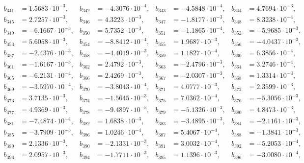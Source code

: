 \begin{align*}
b_{ 341 } &= 1.5683 \cdot 10^{ -3 }, & b_{ 342 } &= -4.3076 \cdot 10^{ -4 }, & b_{ 343 } &= -4.5848 \cdot 10^{ -4 }, & b_{ 344 } &= 4.7694 \cdot 10^{ -3 },\\ 
b_{ 345 } &= 2.7257 \cdot 10^{ -3 }, & b_{ 346 } &= 4.3223 \cdot 10^{ -3 }, & b_{ 347 } &= -1.8177 \cdot 10^{ -3 }, & b_{ 348 } &= 8.3238 \cdot 10^{ -4 },\\ 
b_{ 349 } &= -6.1667 \cdot 10^{ -3 }, & b_{ 350 } &= 5.7352 \cdot 10^{ -3 }, & b_{ 351 } &= -1.1865 \cdot 10^{ -4 }, & b_{ 352 } &= -5.9685 \cdot 10^{ -3 },\\ 
b_{ 353 } &= 5.6058 \cdot 10^{ -3 }, & b_{ 354 } &= -8.8412 \cdot 10^{ -4 }, & b_{ 355 } &= 1.9687 \cdot 10^{ -3 }, & b_{ 356 } &= -4.0437 \cdot 10^{ -3 },\\ 
b_{ 357 } &= -2.4376 \cdot 10^{ -3 }, & b_{ 358 } &= -4.4019 \cdot 10^{ -3 }, & b_{ 359 } &= 1.1827 \cdot 10^{ -4 }, & b_{ 360 } &= 6.3856 \cdot 10^{ -4 },\\ 
b_{ 361 } &= -1.6167 \cdot 10^{ -3 }, & b_{ 362 } &= 2.4792 \cdot 10^{ -3 }, & b_{ 363 } &= -2.4796 \cdot 10^{ -3 }, & b_{ 364 } &= 3.2746 \cdot 10^{ -4 },\\ 
b_{ 365 } &= -6.2131 \cdot 10^{ -4 }, & b_{ 366 } &= 2.4269 \cdot 10^{ -3 }, & b_{ 367 } &= -2.0307 \cdot 10^{ -3 }, & b_{ 368 } &= 1.3314 \cdot 10^{ -3 },\\ 
b_{ 369 } &= -3.5970 \cdot 10^{ -4 }, & b_{ 370 } &= -3.8043 \cdot 10^{ -4 }, & b_{ 371 } &= 4.0777 \cdot 10^{ -3 }, & b_{ 372 } &= 2.3599 \cdot 10^{ -3 },\\ 
b_{ 373 } &= 3.7135 \cdot 10^{ -3 }, & b_{ 374 } &= -1.5645 \cdot 10^{ -3 }, & b_{ 375 } &= 7.0362 \cdot 10^{ -4 }, & b_{ 376 } &= -5.3056 \cdot 10^{ -3 },\\ 
b_{ 377 } &= 4.9369 \cdot 10^{ -3 }, & b_{ 378 } &= -9.4897 \cdot 10^{ -5 }, & b_{ 379 } &= -5.1326 \cdot 10^{ -3 }, & b_{ 380 } &= 4.8473 \cdot 10^{ -3 },\\ 
b_{ 381 } &= -7.4874 \cdot 10^{ -4 }, & b_{ 382 } &= 1.6838 \cdot 10^{ -3 }, & b_{ 383 } &= -3.4895 \cdot 10^{ -3 }, & b_{ 384 } &= -2.1161 \cdot 10^{ -3 },\\ 
b_{ 385 } &= -3.7909 \cdot 10^{ -3 }, & b_{ 386 } &= 1.0246 \cdot 10^{ -4 }, & b_{ 387 } &= 5.4067 \cdot 10^{ -4 }, & b_{ 388 } &= -1.3841 \cdot 10^{ -3 },\\ 
b_{ 389 } &= 2.1336 \cdot 10^{ -3 }, & b_{ 390 } &= -2.1331 \cdot 10^{ -3 }, & b_{ 391 } &= 3.0032 \cdot 10^{ -4 }, & b_{ 392 } &= -5.2053 \cdot 10^{ -4 },\\ 
b_{ 393 } &= 2.0957 \cdot 10^{ -3 }, & b_{ 394 } &= -1.7711 \cdot 10^{ -3 }, & b_{ 395 } &= 1.1396 \cdot 10^{ -3 }, & b_{ 396 } &= -3.0080 \cdot 10^{ -4 },\\ 

\end{align*}
